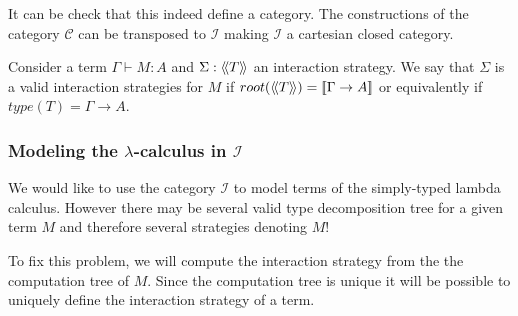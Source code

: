 It can be check that this indeed define a category. The constructions of the category $\mathcal{C}$ can be transposed to $\mathcal{I}$
making $\mathcal{I}$ a cartesian closed category.


\begin{dfn}
Consider a term $\Gamma \vdash M : A$ and $\Sigma : {\langle\!\langle T \rangle\!\rangle}$ an interaction strategy.
We say that $\Sigma$ is a valid interaction strategies for $M$ if $root({\langle\!\langle T \rangle\!\rangle}) = {[\![ \Gamma \rightarrow A ]\!]}$
or equivalently if $type(T) = \Gamma \rightarrow A$.
\end{dfn}


\subsubsection{Modeling the $\lambda$-calculus in $\mathcal{I}$}

We would like to use the category $\mathcal{I}$ to model terms of the
simply-typed lambda calculus. However there may be several valid type decomposition tree for a given term $M$ and therefore
several strategies denoting $M$!

To fix this problem, we will compute the interaction strategy from the
the computation tree of $M$. Since the computation tree is unique it will be possible to uniquely define
the interaction strategy of a term.


